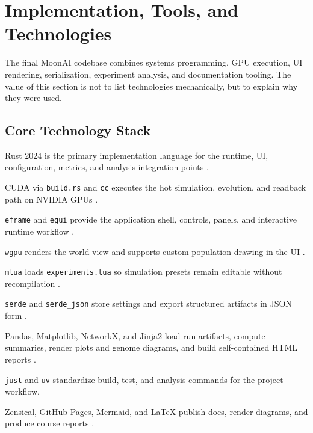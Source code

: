 \section{Implementation, Tools, and Technologies}
\label{sec:implementation}

The final MoonAI codebase combines systems programming, GPU execution, UI rendering,
serialization, experiment analysis, and documentation tooling. The value of this section is not
to list technologies mechanically, but to explain why they were used.

\subsection{Core Technology Stack}

\begin{description}[style=nextline,leftmargin=4.0cm,font=\normalfont\bfseries]
  \item[Systems language] Rust 2024 is the primary implementation language for the runtime, UI,
  configuration, metrics, and analysis integration points \cite{rust}.

  \item[GPU execution] CUDA via \texttt{build.rs} and \texttt{cc} executes the hot simulation,
  evolution, and readback path on NVIDIA GPUs \cite{cuda}.

  \item[Desktop UI] \texttt{eframe} and \texttt{egui} provide the application shell, controls,
  panels, and interactive runtime workflow \cite{egui}.

  \item[GPU rendering] \texttt{wgpu} renders the world view and supports custom population
  drawing in the UI \cite{wgpu}.

  \item[Runtime configuration] \texttt{mlua} loads \texttt{experiments.lua} so simulation
  presets remain editable without recompilation \cite{mlua}.

  \item[Persistence] \texttt{serde} and \texttt{serde\_json} store settings and export
  structured artifacts in JSON form \cite{serde}.

  \item[Analysis] Pandas, Matplotlib, NetworkX, and Jinja2 load run artifacts, compute
  summaries, render plots and genome diagrams, and build self-contained HTML reports
  \cite{pandas,matplotlib,networkx,jinja2}.

  \item[Workflow] \texttt{just} and \texttt{uv} standardize build, test, and analysis commands
  for the project workflow.

  \item[Documentation] Zensical, GitHub Pages, Mermaid, and LaTeX publish docs, render
  diagrams, and produce course reports \cite{mermaid}.
\end{description}

